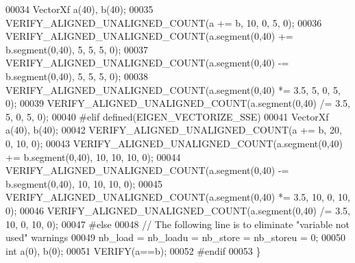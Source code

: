\begin{DoxyCode}
00034   VectorXf a(40), b(40);
00035   VERIFY\_ALIGNED\_UNALIGNED\_COUNT(a += b, 10, 0, 5, 0);
00036   VERIFY\_ALIGNED\_UNALIGNED\_COUNT(a.segment(0,40) += b.segment(0,40), 5, 5, 5, 0);
00037   VERIFY\_ALIGNED\_UNALIGNED\_COUNT(a.segment(0,40) -= b.segment(0,40), 5, 5, 5, 0);
00038   VERIFY\_ALIGNED\_UNALIGNED\_COUNT(a.segment(0,40) *= 3.5, 5, 0, 5, 0);
00039   VERIFY\_ALIGNED\_UNALIGNED\_COUNT(a.segment(0,40) /= 3.5, 5, 0, 5, 0);
00040 \textcolor{preprocessor}{  #elif defined(EIGEN\_VECTORIZE\_SSE)}
00041   VectorXf a(40), b(40);
00042   VERIFY\_ALIGNED\_UNALIGNED\_COUNT(a += b, 20, 0, 10, 0);
00043   VERIFY\_ALIGNED\_UNALIGNED\_COUNT(a.segment(0,40) += b.segment(0,40), 10, 10, 10, 0);
00044   VERIFY\_ALIGNED\_UNALIGNED\_COUNT(a.segment(0,40) -= b.segment(0,40), 10, 10, 10, 0);
00045   VERIFY\_ALIGNED\_UNALIGNED\_COUNT(a.segment(0,40) *= 3.5, 10, 0, 10, 0);
00046   VERIFY\_ALIGNED\_UNALIGNED\_COUNT(a.segment(0,40) /= 3.5, 10, 0, 10, 0);
00047 \textcolor{preprocessor}{  #else}
00048   \textcolor{comment}{// The following line is to eliminate "variable not used" warnings}
00049   nb\_load = nb\_loadu = nb\_store = nb\_storeu = 0;
00050   \textcolor{keywordtype}{int} a(0), b(0);
00051   VERIFY(a==b);
00052 \textcolor{preprocessor}{  #endif}
00053 \}
\end{DoxyCode}
